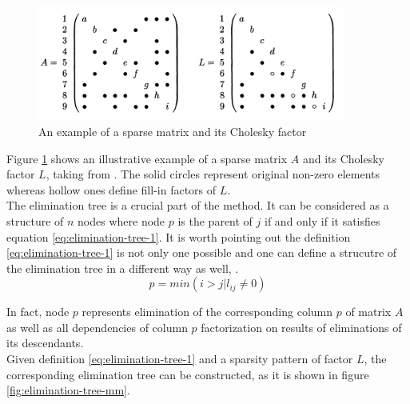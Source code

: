 \begin{figure}[htpb]
  \centering
  \includegraphics[width=0.9\textwidth]{figures/chapter-2/sparsity-pattern-example-mm.png}
\caption{An example of a sparse matrix and its Cholesky factor \cite{mult-frontal-original:2}}
\label{fig:sparsity-pattern-example-mm}
\end{figure}


Figure \ref{fig:sparsity-pattern-example-mm} shows an illustrative example of a sparse matrix $A$ and its Cholesky factor $L$, taking from \cite{mult-frontal-original:2}. The solid circles represent original non-zero elements whereas hollow ones define fill-in factors of $L$. \\


The elimination tree is a crucial part of the method. It can be considered as a structure of $n$ nodes where node $p$ is the parent of $j$ if and only if it satisfies equation \ref{eq:elimination-tree-1}. It is worth pointing out the definition \ref{eq:elimination-tree-1} is not only one possible and one can define a strucutre of the elimination tree in a different way as well, \cite{mult-frontal-original:2}.\\%

\begin{equation} \label{eq:elimination-tree-1}
	p = min(i > j | l_{ij} \neq 0)
\end{equation}


In fact, node $p$ represents elimination of the corresponding column $p$ of matrix $A$ as well as all dependencies of column $p$ factorization on results of eliminations of its descendants.\\


Given definition \ref{eq:elimination-tree-1} and a sparsity pattern of factor $L$, the corresponding elimination tree can be constructed, as it is shown in figure \ref{fig:elimination-tree-mm}.\\


